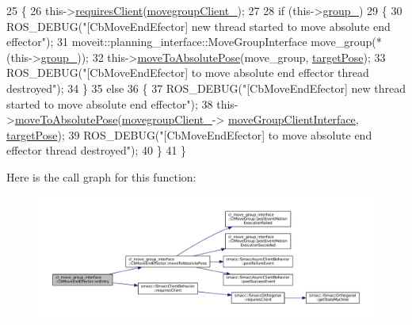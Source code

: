 \begin{DoxyCode}
25 \{
26   this->\hyperlink{classsmacc_1_1ISmaccClientBehavior_a32b16e99e3b4cb289414203dc861a440}{requiresClient}(\hyperlink{classcl__move__group__interface_1_1CbMoveEndEffector_a86583cb37788b461fc8bb38102a8c0ed}{movegroupClient\_});
27 
28   \textcolor{keywordflow}{if} (this->\hyperlink{classcl__move__group__interface_1_1CbMoveEndEffector_a3060dbea1460d4d55ca73b95f4d17575}{group\_})
29   \{
30       ROS\_DEBUG(\textcolor{stringliteral}{"[CbMoveEndEfector] new thread started to move absolute end effector"});
31       moveit::planning\_interface::MoveGroupInterface move\_group(*(this->\hyperlink{classcl__move__group__interface_1_1CbMoveEndEffector_a3060dbea1460d4d55ca73b95f4d17575}{group\_}));
32       this->\hyperlink{classcl__move__group__interface_1_1CbMoveEndEffector_a533ec599a0e248f3cb024e9cdf148db2}{moveToAbsolutePose}(move\_group, \hyperlink{classcl__move__group__interface_1_1CbMoveEndEffector_ab0d0c060e52c6f09a6af727e6e954064}{targetPose});
33       ROS\_DEBUG(\textcolor{stringliteral}{"[CbMoveEndEfector] to move absolute end effector thread destroyed"});
34   \}
35   \textcolor{keywordflow}{else}
36   \{
37       ROS\_DEBUG(\textcolor{stringliteral}{"[CbMoveEndEfector] new thread started to move absolute end effector"});
38       this->\hyperlink{classcl__move__group__interface_1_1CbMoveEndEffector_a533ec599a0e248f3cb024e9cdf148db2}{moveToAbsolutePose}(\hyperlink{classcl__move__group__interface_1_1CbMoveEndEffector_a86583cb37788b461fc8bb38102a8c0ed}{movegroupClient\_}->
      \hyperlink{classcl__move__group__interface_1_1ClMoveGroup_a92922ea689e4e1b7b91512c56629c95b}{moveGroupClientInterface}, \hyperlink{classcl__move__group__interface_1_1CbMoveEndEffector_ab0d0c060e52c6f09a6af727e6e954064}{targetPose});
39       ROS\_DEBUG(\textcolor{stringliteral}{"[CbMoveEndEfector] to move absolute end effector thread destroyed"});
40   \}
41 \}
\end{DoxyCode}
Here is the call graph for this function\+:
\nopagebreak
\begin{figure}[H]
\begin{center}
\leavevmode
\includegraphics[width=350pt]{classcl__move__group__interface_1_1CbMoveEndEffector_a7e7c22ac6c5725bc95e9852c3f6d939d_cgraph}
\end{center}
\end{figure}

